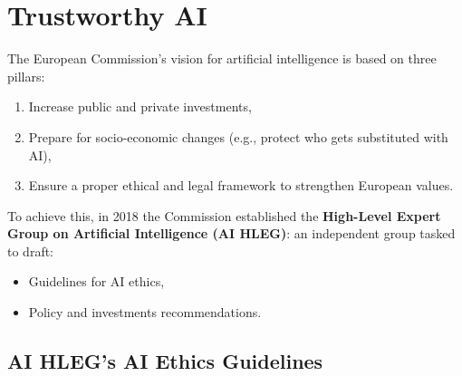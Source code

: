 \chapter{Trustworthy AI}


The European Commission's vision for artificial intelligence is based on three pillars:
\begin{enumerate}
    \item Increase public and private investments,
    \item Prepare for socio-economic changes (e.g., protect who gets substituted with AI),
    \item Ensure a proper ethical and legal framework to strengthen European values.
\end{enumerate}

To achieve this, in 2018 the Commission established the \textbf{High-Level Expert Group on Artificial Intelligence (AI HLEG)}: an independent group tasked to draft:
\begin{itemize}
    \item Guidelines for AI ethics,
    \item Policy and investments recommendations.
\end{itemize}



\section{AI HLEG's AI Ethics Guidelines}

